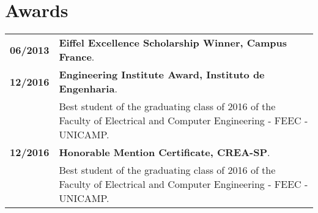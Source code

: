 \documentclass[10pt, a4paper]{article}
\begin{document}

\section{Awards}

\begin{tabular}{p{} p{}}

\textbf{06/2013}  & \textbf{Eiffel Excellence Scholarship Winner, Campus
France}. \vspace{4pt} \\

\textbf{12/2016}  & \textbf{Engineering Institute Award, Instituto de
Engenharia}.\\
& Best student of the graduating class of 2016 of the Faculty of Electrical and
Computer Engineering - FEEC - UNICAMP. \vspace{4pt}\\

\textbf{12/2016}  & \textbf{Honorable Mention Certificate, CREA-SP}. \\
& Best student of the graduating class of 2016 of the Faculty of Electrical and
Computer Engineering - FEEC - UNICAMP. \vspace{4pt}\\

\end{tabular}

% 
% 
% 

\end{document}
